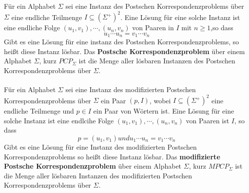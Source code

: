    Für ein Alphabet $\Sigma$ sei eine Instanz des Postschen Korrespondenzproblems über $\Sigma$ eine endliche Teilmenge $I \subseteq (\Sigma^+)^2$. Eine Lösung für eine solche Instanz ist eine endliche Folge $(u_1, v_1), \cdots, (u_n, v_n)$ von Paaren in $I$ mit $n \geq 1$,so dass \[u_1 \cdots u_n = v_1 \cdots v_n\] Gibt es eine Lösung für eine instanz des Postschen Korrespondenzproblems, so heißt diese Instanz lösbar. Das \textbf{Postsche Korrespondenzproblem} über einem Alphabet $\Sigma$, kurz $PCP_{\Sigma}$ ist die Menge aller lösbaren Instanzen des Postschen Korrespondenzproblems über $\Sigma$.\\\\ Für ein Alphabet $\Sigma$ sei eine Instanz des modifizierten Postschen Korrespondenzproblems über $\Sigma$ ein Paar $(p, I)$, wobei $I\subseteq (\Sigma^+)^2$ eine endliche Teilmenge und $p\in I$ ein Paar von Wörtern ist. Eine Lösung für eine solche Instanz ist eine endlcihe Folge $(u_1, v_1), \cdots, (u_n, v_n)$ von Paaren ist $I$, so dass \[p = (u_1, v_1) und u_1\cdots u_n = v_1\cdots v_n\] Gibt es eine Lösung für eine Instanz des modifizierten Postschen Korrespondenzproblems so heißt diese Instanz lösbar. Das \textbf{modifizierte Postsche Korrespondenzproblem} über einem Alphabet $\Sigma$, kurz $MPCP_{\Sigma}$ ist die Menge aller lösbaren Instanzen des modifizierten Postschen Korrespondenzproblems über $\Sigma$.
